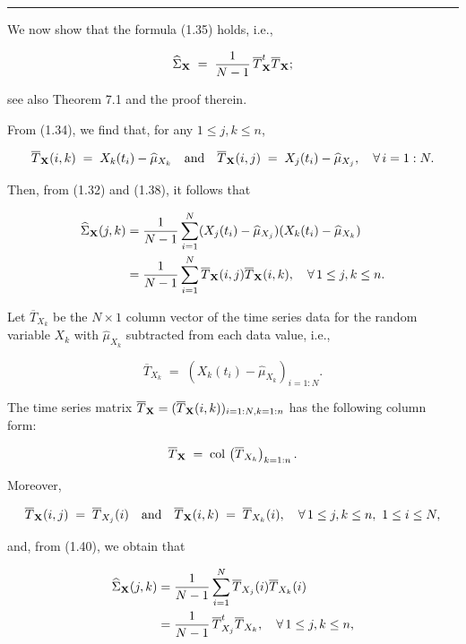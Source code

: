 \medskip
\noindent\rule{\linewidth}{0.4pt}
\medskip

We now show that the formula (1.35) holds, i.e.,

\begin{equation}
\widehat{\Sigma}_{\mathbf{X}} \;=\; \frac{1}{N-1}\,\overline{T}_{\mathbf{X}}^t\overline{T}_{\mathbf{X}};
\end{equation}

see also Theorem 7.1 and the proof therein.

From (1.34), we find that, for any $1\le j,k\le n$,

\begin{equation}
\overline{T}_{\mathbf{X}}(i,k) \;=\; X_k(t_i) - \widehat{\mu}_{X_k} \quad
\text{and} \quad \overline{T}_{\mathbf{X}}(i,j) \;=\; X_j(t_i) - \widehat{\mu}_{X_j},
\quad \forall\, i=1:N.
\end{equation}

Then, from (1.32) and (1.38), it follows that

\begin{align}
\widehat{\Sigma}_{\mathbf{X}}(j,k) &= \frac{1}{N-1}\sum_{i=1}^N
(X_j(t_i)-\widehat{\mu}_{X_j})(X_k(t_i)-\widehat{\mu}_{X_k}) \\
&= \frac{1}{N-1}\sum_{i=1}^N \overline{T}_{\mathbf{X}}(i,j)\overline{T}_{\mathbf{X}}(i,k),
\quad \forall\, 1\le j,k\le n.
\end{align}

Let $\overline{T}_{X_k}$ be the $N\times 1$ column vector of the time series
data for the random variable $X_k$ with $\widehat{\mu}_{X_k}$ subtracted
from each data value, i.e.,

\[
\overline{T}_{X_k} \;=\; \left(X_k(t_i) - \widehat{\mu}_{X_k}\right)_{i=1:N}.
\]

The time series matrix $\overline{T}_{\mathbf{X}} =
(\overline{T}_{\mathbf{X}}(i,k))_{i=1:N,k=1:n}$ has the following column form:

\[
\overline{T}_{\mathbf{X}} \;=\; \mathrm{col}\,\left(\overline{T}_{X_k}\right)_{k=1:n}.
\]

Moreover,

\[
\overline{T}_{\mathbf{X}}(i,j) \;=\; \overline{T}_{X_j}(i) \quad \text{and} \quad
\overline{T}_{\mathbf{X}}(i,k) \;=\; \overline{T}_{X_k}(i), \quad \forall\,
1\le j,k\le n,\ 1\le i\le N,
\]

and, from (1.40), we obtain that

\begin{align}
\widehat{\Sigma}_{\mathbf{X}}(j,k) &= \frac{1}{N-1}\sum_{i=1}^N
\overline{T}_{X_j}(i)\overline{T}_{X_k}(i) \\
&= \frac{1}{N-1}\,\overline{T}_{X_j}^t\overline{T}_{X_k}, \quad \forall\,
1\le j,k\le n,
\end{align}

